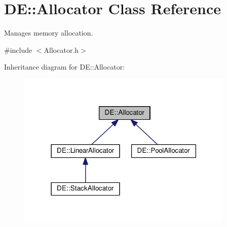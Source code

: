 \hypertarget{classDE_1_1Allocator}{}\section{DE\+:\+:Allocator Class Reference}
\label{classDE_1_1Allocator}


Manages memory allocation.  




{\ttfamily \#include $<$Allocator.\+h$>$}



Inheritance diagram for DE\+:\+:Allocator\+:\nopagebreak
\begin{figure}[H]
\begin{center}
\leavevmode
\includegraphics[width=294pt]{classDE_1_1Allocator__inherit__graph}
\end{center}
\end{figure}
